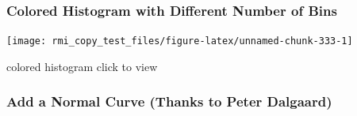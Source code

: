 \documentclass[]{book}
\newenvironment{Shaded}{\begin{snugshade}}{\end{snugshade}}
\newcommand{\DataTypeTok}[1]{\textcolor[rgb]{0.13,0.29,0.53}{#1}}
\newcommand{\DecValTok}[1]{\textcolor[rgb]{0.00,0.00,0.81}{#1}}
\newcommand{\KeywordTok}[1]{\textcolor[rgb]{0.13,0.29,0.53}{\textbf{#1}}}
\newcommand{\NormalTok}[1]{#1}
\newcommand{\OperatorTok}[1]{\textcolor[rgb]{0.81,0.36,0.00}{\textbf{#1}}}
\newcommand{\StringTok}[1]{\textcolor[rgb]{0.31,0.60,0.02}{#1}}
\theoremstyle{definition}
\theoremstyle{definition}
\theoremstyle{definition}
\theoremstyle{remark}
\begin{document}
\hypertarget{colored-histogram-with-different-number-of-bins}{%
\subsubsection{Colored Histogram with Different Number of
Bins}\label{colored-histogram-with-different-number-of-bins}}

\begin{Shaded}
\end{Shaded}

\begin{center}\texttt{[image: rmi\_copy\_test\_files/figure-latex/unnamed-chunk-333-1]} \end{center}

colored histogram click to view

\hypertarget{add-a-normal-curve-thanks-to-peter-dalgaard}{%
\subsubsection{Add a Normal Curve (Thanks to Peter
Dalgaard)}\label{add-a-normal-curve-thanks-to-peter-dalgaard}}

\begin{Shaded}
\end{Shaded}
\end{document}
